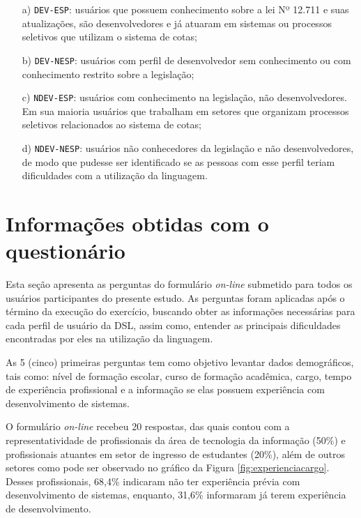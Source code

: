 \begin{enumerate}
    \item[a)] \texttt{DEV-ESP}: usuários que possuem conhecimento sobre a lei Nº 12.711 e suas atualizações, são desenvolvedores e já atuaram em sistemas ou processos seletivos que utilizam o sistema de cotas;
    \item[b)] \texttt{DEV-NESP}: usuários com perfil de desenvolvedor sem conhecimento ou com conhecimento restrito sobre a legislação;
    \item[c)] \texttt{NDEV-ESP}: usuários com conhecimento na legislação, não desenvolvedores. Em sua maioria usuários que trabalham em setores que organizam processos seletivos relacionados ao sistema de cotas;
    \item[d)] \texttt{NDEV-NESP}: usuários não conhecedores da legislação e não desenvolvedores, de modo que pudesse ser identificado se as pessoas com esse perfil teriam dificuldades com a utilização da linguagem.
\end{enumerate}


\begin{landscape}

\end{landscape}

\section{Informações obtidas com o questionário}
\label{sec:perguntasaplicadas}

Esta seção apresenta as perguntas do formulário \textit{on-line} submetido para todos os usuários participantes do presente estudo. As perguntas foram aplicadas após o término da execução do exercício, buscando obter as informações necessárias para cada perfil de usuário da DSL, assim como, entender as principais dificuldades encontradas por eles na utilização da linguagem.

As 5 (cinco) primeiras perguntas tem como objetivo levantar dados demográficos, tais como: nível de formação escolar, curso de formação acadêmica, cargo, tempo de experiência profissional e a informação se elas possuem experiência com desenvolvimento de sistemas.

O formulário \textit{on-line} recebeu 20 respostas, das quais contou com a representatividade de profissionais da área de tecnologia da informação (50\%) e profissionais atuantes em setor de ingresso de estudantes (20\%), além de outros setores como pode ser observado no gráfico da Figura \ref{fig:experienciacargo}. Desses profissionais, 68,4\% indicaram não ter experiência prévia com desenvolvimento de sistemas, enquanto, 31,6\% informaram já terem experiência de desenvolvimento.


